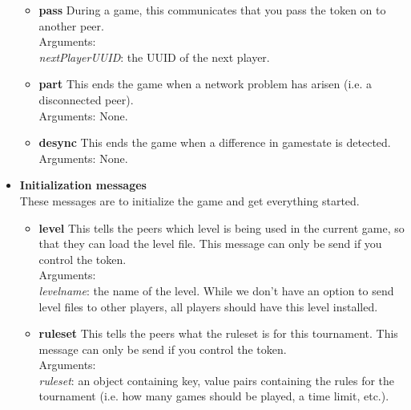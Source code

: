 \begin{itemize}
\begin{itemize}
          \item \textbf{pass}
    During a game, this communicates that you pass the token on to another peer.\\
    Arguments: \\
    \textit{nextPlayerUUID}: the UUID of the next player. \\

          \item \textbf{part}
    This ends the game when a network problem has arisen (i.e. a disconnected peer).\\
    Arguments: None. \\

          \item \textbf{desync}
    This ends the game when a difference in gamestate is detected.\\
    Arguments: None. \\

        \end{itemize}

      \item \textbf{Initialization messages} \\
      These messages are to initialize the game and get everything started.
        \begin{itemize}
          \item \textbf{level}
    This tells the peers which level is being used in the current game, so that they can load the level file. This message can only be send if you control the token. \\
    Arguments: \\
    \textit{levelname}: the name of the level. While we don't have an option to send level files to other players, all players should have this level installed.\\

          \item \textbf{ruleset}
    This tells the peers what the ruleset is for this tournament. This message can only be send if you control the token.\\
    Arguments: \\
    \textit{ruleset}: an object containing key, value pairs containing the rules for the tournament (i.e. how many games should be played, a time limit, etc.). \\
        \end{itemize}


\end{itemize}
